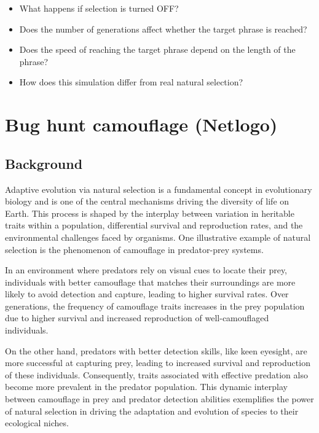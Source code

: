 \documentclass[
  a4paper]{book}
\providecommand{\tightlist}{%
  \setlength{\itemsep}{0pt}\setlength{\parskip}{0pt}}
\begin{document}
\begin{itemize}
\tightlist
\item
  What happens if selection is turned OFF?
\end{itemize}

\begin{itemize}
\tightlist
\item
  Does the number of generations affect whether the target phrase is reached?
\end{itemize}

\begin{itemize}
\tightlist
\item
  Does the speed of reaching the target phrase depend on the length of the phrase?
\end{itemize}

\begin{itemize}
\tightlist
\item
  How does this simulation differ from real natural selection?
\end{itemize}

\chapter{Bug hunt camouflage (Netlogo)}\label{bug-hunt-camouflage-netlogo}

\section{Background}\label{background-1}

Adaptive evolution via natural selection is a fundamental concept in evolutionary biology and is one of the central mechanisms driving the diversity of life on Earth. This process is shaped by the interplay between variation in heritable traits within a population, differential survival and reproduction rates, and the environmental challenges faced by organisms. One illustrative example of natural selection is the phenomenon of camouflage in predator-prey systems.

In an environment where predators rely on visual cues to locate their prey, individuals with better camouflage that matches their surroundings are more likely to avoid detection and capture, leading to higher survival rates. Over generations, the frequency of camouflage traits increases in the prey population due to higher survival and increased reproduction of well-camouflaged individuals.

On the other hand, predators with better detection skills, like keen eyesight, are more successful at capturing prey, leading to increased survival and reproduction of these individuals. Consequently, traits associated with effective predation also become more prevalent in the predator population. This dynamic interplay between camouflage in prey and predator detection abilities exemplifies the power of natural selection in driving the adaptation and evolution of species to their ecological niches.
\end{document}
